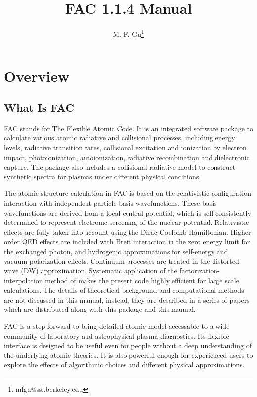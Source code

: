 \documentclass[twoside,letterpaper]{refrep}
\newcommand{\facversion}{{1.1.4}\xspace}
\begin{document}
\title{FAC \facversion Manual}
\author{M. F. Gu\thanks{mfgu@ssl.berkeley.edu}}

\date{}

\maketitle

\tableofcontents

\chapter{Overview}
\label{cha:overview}

\section{What Is FAC}
FAC stands for The Flexible Atomic Code. It is an
integrated software package to calculate various atomic radiative and
collisional processes, including energy levels, radiative transition rates,
collisional excitation and 
ionization by electron impact, photoionization, autoionization, radiative
recombination and dielectronic capture. The package also includes a
collisional radiative model to construct synthetic spectra for plasmas under
different physical conditions. 

The atomic structure calculation in FAC is based on the relativistic
configuration interaction with independent particle basis wavefunctions. These
basis wavefunctions are derived from a local central potential, which is
self-consistently determined to represent electronic screening of the nuclear
potential. Relativistic effects are fully taken into account using the Dirac
Coulomb Hamiltonian. Higher order QED effects are included with Breit
interaction in the zero energy limit for the exchanged photon, and hydrogenic
approximations for self-energy and vacuum polarization effects. 
Continuum processes are treated
in the distorted-wave (DW) approximation. Systematic application of the
factorization-interpolation method of \citet{barshalom88} makes the present
code highly efficient for large scale calculations. The details of theoretical
background and computational methods are not discussed in this manual,
instead, they are described in a series of papers which are distributed along
with this package and this manual.

FAC is a step forward to bring detailed atomic model accessable to a wide
community of laboratory and astrophysical plasma diagnostics. Its flexible
interface is designed to be useful even for people without a deep
understanding of the underlying atomic theories. It is also powerful enough
for experienced users to explore the effects of algorithmic choices and
different physical approximations.
\end{document}

